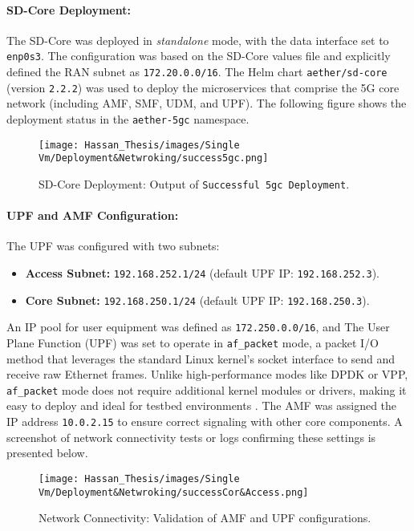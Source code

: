 \paragraph{SD-Core Deployment:}  
The SD-Core was deployed in \emph{standalone} mode, with the data interface set to \texttt{enp0s3}. The configuration was based on the SD-Core values file and explicitly defined the RAN subnet as \texttt{172.20.0.0/16}. The Helm chart \texttt{aether/sd-core} (version \texttt{2.2.2}) was used to deploy the microservices that comprise the 5G core network (including AMF, SMF, UDM, and UPF). The following figure shows the deployment status in the \texttt{aether-5gc} namespace.

\begin{figure}[H]
    \centering
    \texttt{[image: Hassan\_Thesis/images/Single Vm/Deployment\&Netwroking/success5gc.png]}
    \caption{SD-Core Deployment: Output of \texttt{Successful 5gc Deployment}.}
    \label{fig:sdcore_deployment}
\end{figure}

\paragraph{UPF and AMF Configuration:}  
The UPF was configured with two subnets:
\begin{itemize}
    \item \textbf{Access Subnet:} \texttt{192.168.252.1/24} (default UPF IP: \texttt{192.168.252.3}).
    \item \textbf{Core Subnet:} \texttt{192.168.250.1/24} (default UPF IP: \texttt{192.168.250.3}).
\end{itemize}
An IP pool for user equipment was defined as \texttt{172.250.0.0/16}, and The User Plane Function (UPF) was set to operate in \texttt{af\_packet} mode, a packet I/O method that leverages the standard Linux kernel's socket interface to send and receive raw Ethernet frames. Unlike high-performance modes like DPDK or VPP, \texttt{af\_packet} mode does not require additional kernel modules or drivers, making it easy to deploy and ideal for testbed environments . The AMF was assigned the IP address \texttt{10.0.2.15} to ensure correct signaling with other core components. A screenshot of network connectivity tests or logs confirming these settings is presented below.

\begin{figure}[H]
    \centering
    \texttt{[image: Hassan\_Thesis/images/Single Vm/Deployment\&Netwroking/successCor\&Access.png]}
    \caption{Network Connectivity: Validation of AMF and UPF configurations.}
    \label{fig:amf_upf_status}
\end{figure}

